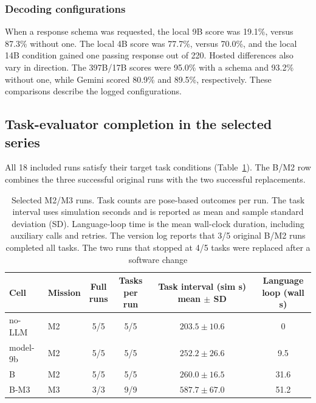 \documentclass[pdflatex,sn-mathphys-num]{sn-jnl}
\begin{document}
\subsubsection{Decoding configurations}
\label{sec:hosted}
When a response schema was requested, the local 9B score was 19.1\%,
versus 87.3\% without one. The local 4B score was 77.7\%, versus
70.0\%, and the local 14B condition gained one passing response out of
220. Hosted differences also vary in direction. The 397B/17B scores were
95.0\% with a schema and 93.2\% without one, while Gemini scored 80.9\%
and 89.5\%, respectively. These comparisons describe the logged
configurations.

\subsection{Task-evaluator completion in the selected series}
All 18 included runs satisfy their target task conditions
(Table~\ref{tab:e2}). The B/M2 row combines the three successful original
runs with the two successful replacements.

\begin{table}[!htbp]
\centering
\caption{Selected M2/M3 runs. Task counts are pose-based outcomes per run.
The task interval uses simulation seconds and is reported as mean and sample
standard deviation (SD). Language-loop time is the mean wall-clock duration,
including auxiliary calls and retries. The version log reports that 3/5
original B/M2 runs completed all tasks. The two runs that stopped at 4/5
tasks were replaced after a software change}
\label{tab:e2}
\setlength{\tabcolsep}{4pt}
\begin{tabular}{llcccc}
\toprule
Cell & Mission & \makecell{Full\\runs} & \makecell{Tasks\\per run}
 & \makecell{Task interval (sim s)\\mean $\pm$ SD} & \makecell{Language\\loop (wall s)} \\
\midrule
no-LLM   & M2 & 5/5 & 5/5 & $203.5 \pm 10.6$ & 0 \\
model-9b & M2 & 5/5 & 5/5 & $252.2 \pm 26.6$ & 9.5 \\
B        & M2 & 5/5 & 5/5 & $260.0 \pm 16.5$ & 31.6 \\
B-M3     & M3 & 3/3 & 9/9 & $587.7 \pm 67.0$ & 51.2 \\
\bottomrule
\end{tabular}
\end{table}
\end{document}
